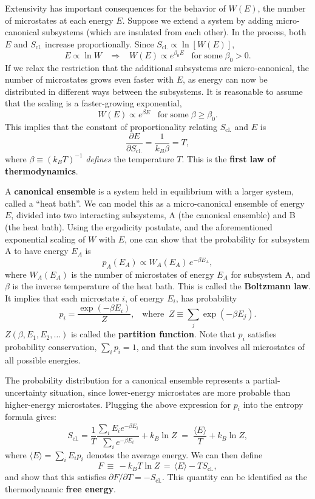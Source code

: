 \documentclass[pra,12pt]{revtex4}
\begin{document}
Extensivity has important consequences for the behavior of $W(E)$, the
number of microstates at each energy $E$.  Suppose we extend a system
by adding micro-canonical subsystems (which are insulated from each
other).  In the process, both $E$ and $S_{\mathrm{cl.}}$ increase
proportionally.  Since $S_{\mathrm{cl.}} \propto \ln[W(E)]$,
$$E \propto \ln W \;\;\;\Rightarrow \;\;\;W(E) \propto e^{\beta_0 E} \;\;\; \mathrm{for\;some}\; \beta_0 > 0.$$
If we relax the restriction that the additional subsystems are
micro-canonical, the number of microstates grows even faster with $E$,
as energy can now be distributed in different ways between the
subsystems.  It is reasonable to assume that the scaling is a
faster-growing exponential,
$$W(E) \propto e^{\beta E} \;\;\; \mathrm{for\;some}\; \beta \ge \beta_0.$$
This implies that the constant of proportionality relating
$S_{\mathrm{cl.}}$ and $E$ is
$$\frac{\partial E}{\partial S_{\mathrm{cl.}}} = \frac{1}{k_B \beta} = T,$$
where $\beta \equiv (k_BT)^{-1}$ \textit{defines} the temperature $T$.
This is the \textbf{first law of thermodynamics}.

A \textbf{canonical ensemble} is a system held in equilibrium with a
larger system, called a ``heat bath''.  We can model this as a
micro-canonical ensemble of energy $E$, divided into two interacting
subsystems, A (the canonical ensemble) and B (the heat bath).  Using
the ergodicity postulate, and the aforementioned exponential scaling
of $W$ with $E$, one can show that the probability for subsystem A to
have energy $E_A$ is
$$p_A(E_A) \propto W_A(E_A) \, e^{-\beta E_A},$$
where $W_A(E_A)$ is the number of microstates of energy $E_A$ for
subsystem A, and $\beta$ is the inverse temperature of the heat bath.
This is called the \textbf{Boltzmann law}.  It implies that each
microstate $i$, of energy $E_i$, has probability
$$p_i = \frac{\exp(-\beta E_i)}{Z}, \;\;\;\mathrm{where}\;\;Z \equiv \sum_j \exp(-\beta E_j).$$
$Z(\beta,E_1, E_2,\dots)$ is called the \textbf{partition function}.
Note that $p_i$ satisfies probability conservation, $\sum_i p_i = 1$,
and that the sum involves all microstates of all possible energies.

The probability distribution for a canonical ensemble represents a
partial-uncertainty situation, since lower-energy microstates are
more probable than higher-energy microstates.  Plugging the above
expression for $p_i$ into the entropy formula gives:
$$S_{\mathrm{cl.}} = \frac{1}{T} \frac{\sum_i E_i e^{-\beta E_i}}{\sum_i e^{-\beta E_i}} + k_B \ln Z \;=\; \frac{\langle E\rangle}{T} + k_B \ln Z,$$
where $\langle E\rangle = \sum_i E_i p_i$ denotes the average energy.
We can then define
$$F \,\equiv\, - k_B T \ln Z \,=\, \langle E \rangle - TS_{\mathrm{cl.}},$$
and show that this satisfies $\partial F/\partial T = -
S_{\mathrm{cl.}}$.  This quantity can be identified as the
thermodynamic \textbf{free energy}.
\end{document}
